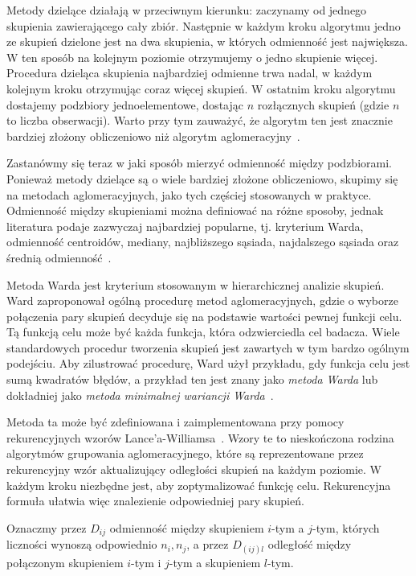 \documentclass{praca1}
\begin{document}
Metody dzielące działają w przeciwnym kierunku: zaczynamy od jednego skupienia zawierającego cały zbiór. Następnie w każdym kroku algorytmu jedno ze skupień dzielone jest na dwa skupienia, w których odmienność jest największa. W ten sposób na kolejnym poziomie otrzymujemy o jedno skupienie więcej. Procedura dzieląca skupienia najbardziej odmienne trwa nadal, w każdym kolejnym kroku otrzymując coraz więcej skupień. W ostatnim kroku algorytmu dostajemy podzbiory jednoelementowe, dostając $n$ rozłącznych skupień (gdzie $n$ to liczba obserwacji). Warto przy tym zauważyć, że algorytm ten jest znacznie bardziej złożony obliczeniowo niż algorytm aglomeracyjny~\cite{Hastie2009:elements, Koronacki2005:statystyczne}.

Zastanówmy się teraz w jaki sposób mierzyć odmienność między podzbiorami. Ponieważ metody dzielące są o wiele bardziej złożone obliczeniowo, skupimy się na metodach aglomeracyjnych, jako tych częściej stosowanych w praktyce. Odmienność między skupieniami można definiować na różne sposoby, jednak literatura podaje zazwyczaj najbardziej popularne, tj. kryterium Warda, odmienność centroidów, mediany, najbliższego sąsiada, najdalszego sąsiada oraz średnią odmienność~\cite{Hastie2009:elements, Koronacki2005:statystyczne}.

Metoda Warda jest kryterium stosowanym w hierarchicznej analizie skupień. Ward zaproponował ogólną procedurę metod aglomeracyjnych, gdzie o wyborze połączenia pary skupień decyduje się na podstawie wartości pewnej funkcji celu. Tą funkcją celu może być każda funkcja, która odzwierciedla cel badacza. Wiele standardowych procedur tworzenia skupień jest zawartych w tym bardzo ogólnym podejściu. Aby zilustrować procedurę, Ward użył przykładu, gdy funkcja celu jest sumą kwadratów błędów, a przykład ten jest znany jako \emph{metoda Warda} lub dokładniej jako \emph{metoda minimalnej wariancji Warda}~\cite{Ward1963:hierarchical}.

Metoda ta może być zdefiniowana i zaimplementowana przy pomocy rekurencyjnych wzorów Lance'a-Williamsa~\cite{Lance1967:hierarchical}. Wzory te to nieskończona rodzina algorytmów grupowania aglomeracyjnego, które są reprezentowane przez rekurencyjny wzór aktualizujący odległości skupień na każdym poziomie. W każdym kroku niezbędne jest, aby zoptymalizować funkcję celu. Rekurencyjna formuła ułatwia więc znalezienie odpowiedniej pary skupień.	

Oznaczmy przez $D_{ij}$ odmienność między skupieniem $i$-tym a $j$-tym, których liczności wynoszą odpowiednio $n_i, n_j$, a przez $D_{(ij)l}$ odległość między połączonym skupieniem $i$-tym i $j$-tym a skupieniem $l$-tym.
\end{document}
